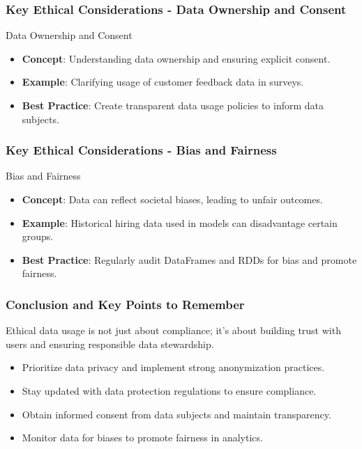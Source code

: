 \documentclass[aspectratio=169]{beamer}
\begin{document}
\begin{frame}[fragile]
    \frametitle{Key Ethical Considerations - Data Ownership and Consent}
    \begin{block}{Data Ownership and Consent}
        \begin{itemize}
            \item \textbf{Concept}: Understanding data ownership and ensuring explicit consent.
            \item \textbf{Example}: Clarifying usage of customer feedback data in surveys.
            \item \textbf{Best Practice}: Create transparent data usage policies to inform data subjects.
        \end{itemize}
    \end{block}
\end{frame}

\begin{frame}[fragile]
    \frametitle{Key Ethical Considerations - Bias and Fairness}
    \begin{block}{Bias and Fairness}
        \begin{itemize}
            \item \textbf{Concept}: Data can reflect societal biases, leading to unfair outcomes.
            \item \textbf{Example}: Historical hiring data used in models can disadvantage certain groups.
            \item \textbf{Best Practice}: Regularly audit DataFrames and RDDs for bias and promote fairness.
        \end{itemize}
    \end{block}
\end{frame}

\begin{frame}[fragile]
    \frametitle{Conclusion and Key Points to Remember}
    Ethical data usage is not just about compliance; it's about building trust with users and ensuring responsible data stewardship. 
    \begin{itemize}
        \item Prioritize data privacy and implement strong anonymization practices.
        \item Stay updated with data protection regulations to ensure compliance.
        \item Obtain informed consent from data subjects and maintain transparency.
        \item Monitor data for biases to promote fairness in analytics.
    \end{itemize}
\end{frame}
\end{document}
